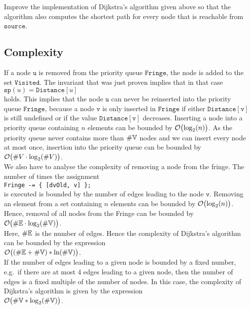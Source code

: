 \exercise
Improve the implementation of Dijkstra's algorithm given above so that the algorithm also computes
the shortest path for every node that is reachable from $\texttt{source}$.
\eox


\subsection{Complexity}
If a node $\texttt{u}$ is removed from the priority queue $\texttt{Fringe}$, the node is added to the set
$\texttt{Visited}$.  The invariant that was just proven implies that in that case
\\[0.2cm]
\hspace*{1.3cm}
$\texttt{sp}(u) = \texttt{Distance}[u]$
\\[0.2cm]
holds.  This implies that the node $\texttt{u}$ can never be reinserted into the priority queue
$\texttt{Fringe}$, because a node $\texttt{v}$ is only inserted in $\texttt{Fringe}$ if either 
 $\texttt{Distance}[\texttt{v}]$ is still undefined or if  the  value $\texttt{Distance}[\texttt{v}]$ decreases.  
Inserting a node into a priority queue containing  $n$ elements can be bounded by
$\mathcal{O}\bigl(\log_2(n)\bigr)$.  As the priority queue never contains more than $\#{\mathbb V}$ nodes and we
can insert every node at most once, insertion into the priority queue can be bounded by
\\[0.2cm]
\hspace*{1.3cm}
$\mathcal{O}\bigl(\#V \cdot \log_2(\#V)\bigr)$.
\\[0.2cm]
We also have to analyse the complexity of removing a node from the fringe. 
The number of times the assignment
\\[0.2cm]
\hspace*{1.3cm}
\texttt{Fringe -= \{ [dvOld, v] \};} 
\\[0.2cm]
is executed is bounded by the number of edges leading to the node $\texttt{v}$.
Removing an element from a set containing $n$ elements can be bounded by
 $\mathcal{O}\bigl(\log_2(n)\bigr)$.  Hence, removal of all nodes from the Fringe can be bounded by
\\[0.2cm]
\hspace*{1.3cm}
$\mathcal{O}\bigl(\#{\mathbb E} \cdot \log_2(\#{\mathbb V})\bigr)$.
\\[0.2cm]
Here,  $\#{\mathbb E}$ is the number of edges.  Hence the complexity of Dijkstra's algorithm can be
bounded by the expression \\[0.2cm]
\hspace*{1.3cm} $\mathcal{O}\bigl((\#{\mathbb E} + \#{\mathbb V}) * \ln(\#{\mathbb V})\bigr)$. \\[0.2cm]
If the number of edges leading  to a given node is bounded by a fixed number, e.g.~if there
are at most 4 edges leading to a given node, then the number of edges is a fixed multiple of the
number of nodes.  In this case, the complexity of 
 Dijkstra's algorithm is given by the expression  
\\[0.2cm]
\hspace*{1.3cm}
$\mathcal{O}\bigl(\#{\mathbb V} * \log_2(\#{\mathbb V})\bigr)$.

